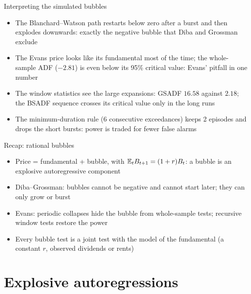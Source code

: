\begin{frame}{Interpreting the simulated bubbles}
\itemsize{\small}
\begin{itemize}
    \item The Blanchard--Watson path restarts below zero after a burst and then explodes downwards: exactly the negative bubble that Diba and Grossman exclude
    \item The Evans price looks like its fundamental most of the time; the whole-sample ADF ($\ensuremath{-}2.81$) is even below its 95\% critical value: Evans' pitfall in one number
    \item The window statistics see the large expansions: GSADF $16.58$ against $2.18$; the BSADF sequence crosses its critical value only in the long runs
    \item The minimum-duration rule ($6$ consecutive exceedances) keeps 2 episodes and drops the short bursts: power is traded for fewer false alarms
\end{itemize}
\end{frame}

\begin{frame}{Recap: rational bubbles}
\itemsize{\small}
\begin{itemize}
    \item Price = fundamental + bubble, with $\mathbb{E}_t B_{t+1} = (1 + r)B_t$: a bubble is an explosive autoregressive component
    \item Diba--Grossman: bubbles cannot be negative and cannot start later; they can only grow or burst
    \item Evans: periodic collapses hide the bubble from whole-sample tests; recursive window tests restore the power
    \item Every bubble test is a joint test with the model of the fundamental (a constant $r$, observed dividends or rents)
\end{itemize}
\end{frame}


\section{Explosive autoregressions}

